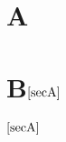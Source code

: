 \documentclass{article}
\begin{document}
\tableofcontents

\section{A}\label{secA}

\section{B$\ref{secA}$}
$\ref{secA}$
\end{document}
